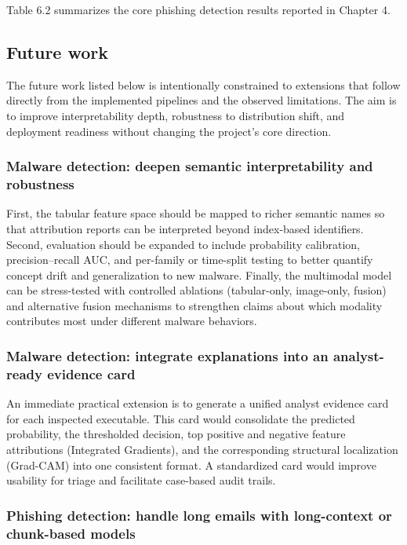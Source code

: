 \documentclass[conference]{IEEEtran}
\begin{document}
Table 6.2 summarizes the core phishing detection results reported in Chapter 4.

\subsection{Future work}

The future work listed below is intentionally constrained to extensions that follow directly from the implemented pipelines and the observed limitations. The aim is to improve interpretability depth, robustness to distribution shift, and deployment readiness without changing the project’s core direction.

\subsubsection{Malware detection: deepen semantic interpretability and robustness}

First, the tabular feature space should be mapped to richer semantic names so that attribution reports can be interpreted beyond index-based identifiers. Second, evaluation should be expanded to include probability calibration, precision--recall AUC, and per-family or time-split testing to better quantify concept drift and generalization to new malware. Finally, the multimodal model can be stress-tested with controlled ablations (tabular-only, image-only, fusion) and alternative fusion mechanisms to strengthen claims about which modality contributes most under different malware behaviors.

\subsubsection{Malware detection: integrate explanations into an analyst-ready evidence card}

An immediate practical extension is to generate a unified analyst evidence card for each inspected executable. This card would consolidate the predicted probability, the thresholded decision, top positive and negative feature attributions (Integrated Gradients), and the corresponding structural localization (Grad-CAM) into one consistent format. A standardized card would improve usability for triage and facilitate case-based audit trails.

\subsubsection{Phishing detection: handle long emails with long-context or chunk-based models}
\end{document}
